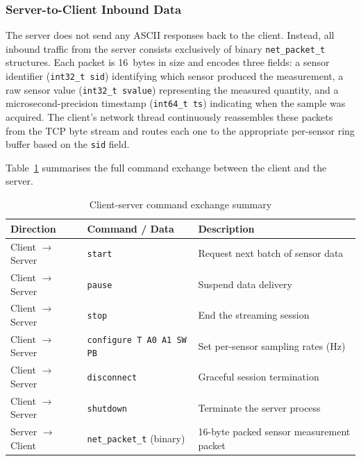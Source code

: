 \subsubsection*{Server-to-Client Inbound Data}

The server does not send any ASCII responses back to the client. Instead, all
inbound traffic from the server consists exclusively of binary
\texttt{net\_packet\_t} structures. Each packet is 16~bytes in size and encodes
three fields: a sensor identifier (\texttt{int32\_t sid}) identifying which sensor
produced the measurement, a raw sensor value (\texttt{int32\_t svalue}) representing
the measured quantity, and a microsecond-precision timestamp (\texttt{int64\_t ts})
indicating when the sample was acquired. The client's network thread continuously
reassembles these packets from the TCP byte stream and routes each one to the
appropriate per-sensor ring buffer based on the \texttt{sid} field.

Table~\ref{tab:cmd_exchange} summarises the full command exchange between the client
and the server.

\begin{table}[h]
\centering
\caption{Client-server command exchange summary}
\label{tab:cmd_exchange}
\begin{tabular}{lll}
\hline
\textbf{Direction}       & \textbf{Command / Data}              & \textbf{Description}                        \\
\hline
Client $\rightarrow$ Server & \texttt{start}                    & Request next batch of sensor data           \\
Client $\rightarrow$ Server & \texttt{pause}                    & Suspend data delivery                       \\
Client $\rightarrow$ Server & \texttt{stop}                     & End the streaming session                   \\
Client $\rightarrow$ Server & \texttt{configure T A0 A1 SW PB}  & Set per-sensor sampling rates (Hz)          \\
Client $\rightarrow$ Server & \texttt{disconnect}               & Graceful session termination                \\
Client $\rightarrow$ Server & \texttt{shutdown}                 & Terminate the server process                \\
Server $\rightarrow$ Client & \texttt{net\_packet\_t} (binary)  & 16-byte packed sensor measurement packet    \\
\hline
\end{tabular}
\end{table}


